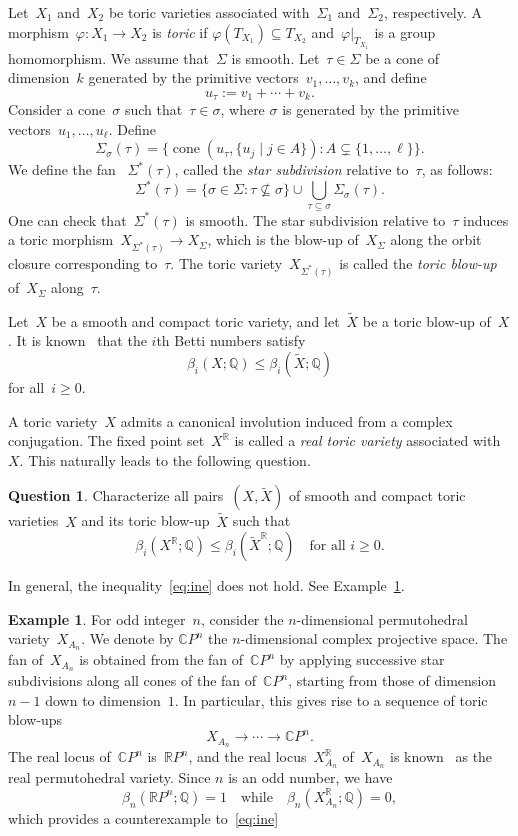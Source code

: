 \documentclass[10pt]{amsart}
\theoremstyle{plain}
\numberwithin{equation}{section}
\theoremstyle{definition}
\newtheorem{example}[theorem]{Example}
\newtheorem{question}[theorem]{Question}
\newcommand{\CP}{\mathbb{C}P}
\newcommand{\RP}{\mathbb{R}P}
\newcommand{\Q}{\mathbb{Q}}
\newcommand{\R}{\mathbb{R}}
\DeclareMathOperator{\cone}{cone}
\begin{document}
Let~$X_1$ and~$X_2$ be toric varieties associated with~$\Sigma_1$ and~$\Sigma_2$, respectively.
A morphism~$\varphi \colon X_1 \to X_2$ is \emph{toric} if $\varphi(T_{X_1}) \subseteq T_{X_2}$ and~$\varphi \vert_{T_{X_1}}$ is a group homomorphism.
We assume that~$\Sigma$ is smooth.
Let~$\tau \in \Sigma$ be a cone of dimension~$k$ generated by the primitive vectors~$v_1,\ldots,v_k$, and define
$$
u_\tau := v_1 + \cdots + v_k.
$$
Consider a cone~$\sigma$ such that~$\tau \in \sigma$, 
where $\sigma$ is generated by the primitive vectors~$u_1,\ldots,u_\ell$.
Define
$$
\Sigma_\sigma(\tau)
  = \{\cone(u_\tau,\{u_j \mid j \in A\}) \colon A \subsetneq \{1,\ldots,\ell\}\}.
$$
We define the fan ~$\Sigma^\ast(\tau)$, called the \emph{star subdivision} relative to~$\tau$, as follows:
$$
\Sigma^\ast(\tau) = \{\sigma \in \Sigma \colon \tau \not\subseteq \sigma \} \cup \bigcup_{\tau \subseteq \sigma}\Sigma_\sigma(\tau).
$$
One can check that~$\Sigma^\ast(\tau)$ is smooth.
The star subdivision relative to~$\tau$ induces a toric morphism~$X_{\Sigma^\ast(\tau)} \to X_{\Sigma}$, which is the blow-up of~$X_\Sigma$ along the orbit closure corresponding to~$\tau$.
The toric variety~$X_{\Sigma^\ast(\tau)}$ is called the \emph{toric blow-up} of~$X_\Sigma$ along~$\tau$.

Let~$X$ be a smooth and compact toric variety, and let~$\widetilde{X}$ be a toric blow-up of~$X$.
It is known~\cite{Voisin-Book2002} that the $i$th Betti numbers satisfy
$$
\beta_i(X;\Q) \leq \beta_i(\widetilde{X};\Q)
$$
for all~$i \geq 0$.

A toric variety~$X$ admits a canonical involution induced from a complex conjugation.
The fixed point set~$X^\R$ is called a \emph{real toric variety} associated with~$X$.
This naturally leads to the following question.
\begin{question}\label{ques1}
     Characterize all pairs~$(X,\widetilde{X})$ of smooth and compact toric varieties~$X$ and its toric blow-up~$\widetilde{X}$ such that
    \begin{equation}\label{eq:ine}
      \beta_i(X^\R;\Q) \leq \beta_i(\widetilde{X}^\R;\Q) \quad \text{for all } i \geq 0.
    \end{equation}
\end{question}
In general, the inequality~\eqref{eq:ine} does not hold.
See Example~\ref{ex:per_proj}.
\begin{example}\label{ex:per_proj}
    For odd integer~$n$, consider the $n$-dimensional permutohedral variety~$X_{A_n}$.
    We denote by $\CP^n$ the $n$-dimensional complex projective space.
    The fan of~$X_{A_n}$ is obtained from the fan of~$\CP^n$ by applying successive star subdivisions along all cones of the fan of~$\CP^n$, starting from those of dimension~$n-1$ down to dimension~$1$.
    In particular, this gives rise to a sequence of toric blow-ups
    $$
    X_{A_n} \to \cdots \to \CP^n.
    $$
    The real locus of~$\CP^n$ is~$\RP^n$, and the real locus~$X^\R_{A_n}$ of~$X_{A_n}$ is known~\cite{Henderson2012, Choi-Yoon2023} as the real permutohedral variety.
    Since $n$ is an odd number, we have
    $$
    \beta_n(\RP^n;\Q) = 1 \quad\text{while}\quad  \beta_n(X^\R_{A_n};\Q) = 0,
    $$
    which provides a counterexample to~\eqref{eq:ine}
\end{example}
\end{document}
